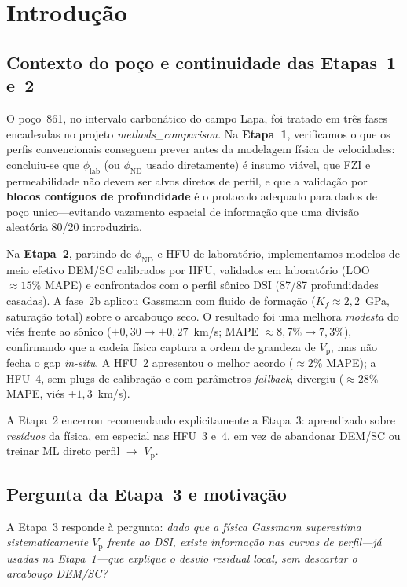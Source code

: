 \documentclass[11pt,a4paper]{article}
\numberwithin{equation}{section}
\newcommand{\Vp}{\ensuremath{V_{\mathrm{p}}}}
\newcommand{\philab}{\ensuremath{\phi_{\mathrm{lab}}}}
\newcommand{\phiND}{\ensuremath{\phi_{\mathrm{ND}}}}
\begin{document}
\section{Introdução}
\label{sec:intro}

\subsection{Contexto do poço e continuidade das Etapas~1 e~2}

O poço~861, no intervalo carbonático do campo Lapa, foi tratado em três fases
encadeadas no projeto \emph{methods\_comparison}.
Na \textbf{Etapa~1}, verificamos o que os perfis convencionais conseguem prever
antes da modelagem física de velocidades: concluiu-se que \philab{} (ou
\phiND{} usado diretamente) é insumo viável, que FZI e permeabilidade não
devem ser alvos diretos de perfil, e que a validação por \textbf{blocos
contíguos de profundidade} é o protocolo adequado para dados de poço
unico---evitando vazamento espacial de informação que uma divisão
aleatória 80/20 introduziria.

Na \textbf{Etapa~2}, partindo de \phiND{} e HFU de laboratório, implementamos
modelos de meio efetivo DEM/SC calibrados por HFU, validados em laboratório
(LOO $\approx 15\%$ MAPE) e confrontados com o perfil sônico DSI (87/87
profundidades casadas).
A fase~2b aplicou Gassmann com fluido de formação ($K_f \approx 2{,}2$~GPa,
saturação total) sobre o arcabouço seco.
O resultado foi uma melhora \emph{modesta} do viés frente ao sônico
($+0{,}30 \rightarrow +0{,}27$~km/s; MAPE $\approx 8{,}7\% \rightarrow 7{,}3\%$),
confirmando que a cadeia física captura a ordem de grandeza de \Vp{}, mas não
fecha o gap \emph{in-situ}.
A HFU~2 apresentou o melhor acordo ($\approx 2\%$ MAPE); a HFU~4, sem plugs de
calibração e com parâmetros \emph{fallback}, divergiu ($\approx 28\%$
MAPE, viés $+1{,}3$~km/s).

A Etapa~2 encerrou recomendando explicitamente a Etapa~3: aprendizado sobre
\emph{resíduos} da física, em especial nas HFU~3 e~4, em vez de abandonar
DEM/SC ou treinar ML direto perfil $\rightarrow$ \Vp{}.

\subsection{Pergunta da Etapa~3 e motivação}

A Etapa~3 responde à pergunta:
\emph{dado que a física Gassmann superestima sistematicamente \Vp{} frente ao
DSI, existe informação nas curvas de perfil---já usadas na Etapa~1---que
explique o desvio residual local, sem descartar o arcabouço DEM/SC?}
\end{document}
